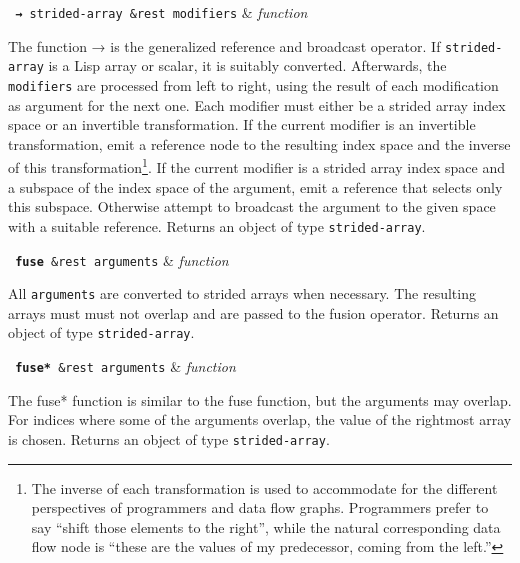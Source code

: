 \begin{function}
  \texttt{ \textbf{→} strided-array \&rest modifiers} & \textsl{function} \\
\end{function}

The function → is the generalized reference and broadcast operator. If
\texttt{strided-array} is a Lisp array or scalar, it is suitably converted.
Afterwards, the \texttt{modifiers} are processed from left to right, using
the result of each modification as argument for the next one. Each modifier
must either be a strided array index space or an invertible
transformation. If the current modifier is an invertible transformation,
emit a reference node to the resulting index space and the inverse of this
transformation\footnote{The inverse of each transformation is used to
  accommodate for the different perspectives of programmers and data flow
  graphs.  Programmers prefer to say ``shift those elements to the right'',
  while the natural corresponding data flow node is ``these are the values
  of my predecessor, coming from the left.''}. If the current modifier is a
strided array index space and a subspace of the index space of the
argument, emit a reference that selects only this subspace. Otherwise
attempt to broadcast the argument to the given space with a suitable
reference. Returns an object of type \texttt{strided-array}.

\begin{function}
  \texttt{ \textbf{fuse} \&rest arguments} & \textsl{function} \\
\end{function}

All \texttt{arguments} are converted to strided arrays when necessary. The
resulting arrays must must not overlap and are passed to the fusion
operator. Returns an object of type \texttt{strided-array}.

\begin{function}
  \texttt{ \textbf{fuse*} \&rest arguments} & \textsl{function} \\
\end{function}

The fuse* function is similar to the fuse function, but the arguments may
overlap. For indices where some of the arguments overlap, the value of the
rightmost array is chosen. Returns an object of type
\texttt{strided-array}.
